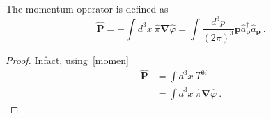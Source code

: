     The momentum operator is defined as 
    \begin{equation}\label{momop}
        \hat{\mathbf P} = - \int d^3 x ~ \hat \pi \boldsymbol \nabla \hat \varphi = \int \frac{d^3 p}{(2\pi)^3} \mathbf p \hat a_{\mathbf p}^\dagger \hat a_{\mathbf p}~.
    \end{equation}
    \begin{proof}
        Infact, using~\eqref{momen}
        \begin{equation*}
        \begin{aligned}
            \hat{\mathbf P} & = \int d^3 x ~ T^{0i} \\ & = \int d^3 x ~ \hat \pi \boldsymbol \nabla \hat \varphi ~.
        \end{aligned}
        \end{equation*}


\end{proof}
